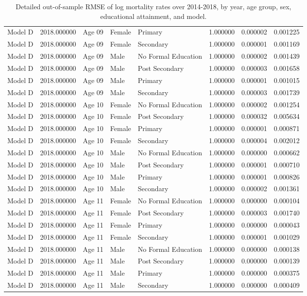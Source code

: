 \begin{table}[ht]
\begin{tabular}{lrlllrrr}
Model D & 2018.000000 & Age 09 & Female & Primary & 1.000000 & 0.000002 & 0.001225 \\
Model D & 2018.000000 & Age 09 & Female & Secondary & 1.000000 & 0.000001 & 0.001169 \\
Model D & 2018.000000 & Age 09 & Male & No Formal Education & 1.000000 & 0.000002 & 0.001439 \\
Model D & 2018.000000 & Age 09 & Male & Post Secondary & 1.000000 & 0.000003 & 0.001658 \\
Model D & 2018.000000 & Age 09 & Male & Primary & 1.000000 & 0.000001 & 0.001015 \\
Model D & 2018.000000 & Age 09 & Male & Secondary & 1.000000 & 0.000003 & 0.001739 \\
Model D & 2018.000000 & Age 10 & Female & No Formal Education & 1.000000 & 0.000002 & 0.001254 \\
Model D & 2018.000000 & Age 10 & Female & Post Secondary & 1.000000 & 0.000032 & 0.005634 \\
Model D & 2018.000000 & Age 10 & Female & Primary & 1.000000 & 0.000001 & 0.000871 \\
Model D & 2018.000000 & Age 10 & Female & Secondary & 1.000000 & 0.000004 & 0.002012 \\
Model D & 2018.000000 & Age 10 & Male & No Formal Education & 1.000000 & 0.000000 & 0.000662 \\
Model D & 2018.000000 & Age 10 & Male & Post Secondary & 1.000000 & 0.000001 & 0.000710 \\
Model D & 2018.000000 & Age 10 & Male & Primary & 1.000000 & 0.000001 & 0.000826 \\
Model D & 2018.000000 & Age 10 & Male & Secondary & 1.000000 & 0.000002 & 0.001361 \\
Model D & 2018.000000 & Age 11 & Female & No Formal Education & 1.000000 & 0.000000 & 0.000104 \\
Model D & 2018.000000 & Age 11 & Female & Post Secondary & 1.000000 & 0.000003 & 0.001740 \\
Model D & 2018.000000 & Age 11 & Female & Primary & 1.000000 & 0.000000 & 0.000043 \\
Model D & 2018.000000 & Age 11 & Female & Secondary & 1.000000 & 0.000001 & 0.001029 \\
Model D & 2018.000000 & Age 11 & Male & No Formal Education & 1.000000 & 0.000000 & 0.000138 \\
Model D & 2018.000000 & Age 11 & Male & Post Secondary & 1.000000 & 0.000000 & 0.000139 \\
Model D & 2018.000000 & Age 11 & Male & Primary & 1.000000 & 0.000000 & 0.000375 \\
Model D & 2018.000000 & Age 11 & Male & Secondary & 1.000000 & 0.000000 & 0.000409 \\
\hline
\end{tabular}
\caption{Detailed out-of-sample RMSE of log mortality rates over 2014-2018, by year, age group, sex, educational attainment, and model.}
\label{tab:mortality_rmse_detailed}
\end{table}

